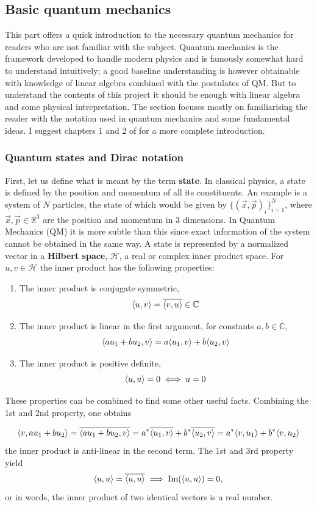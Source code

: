 
\subsection{Basic quantum mechanics}
This part offers a quick introduction to the necessary quantum mechanics for readers who are not familiar with the subject. Quantum mechanics is the framework developed to handle modern physics and is famously somewhat hard to understand intuitively; 
a good baseline understanding is however obtainable with knowledge of linear algebra combined with the postulates of QM. But to understand the contents of this project it should be enough with linear algebra and some physical intrepretation. The section focuses mostly on familiarising the reader with the notation used in quantum mechanics and some fundamental ideas. I suggest chapters 1  and 2 of \cite{Sakurai} for a more complete introduction.


\subsubsection{Quantum states and Dirac notation}
First, let us define what is meant by the term \textbf{state}. In classical physics, a state is defined by the position and momentum of all its constituents. An example is a system of $N$ particles, the state of which would be given by $\{ (\vec{x}, \vec{p})_i \}_{i=1}^N$, where $\vec{x},\vec{p} \in \mathbb{R}^3$ are the position and momentum in 3 dimensions. In Quantum Mechanics (QM) it is more subtle than this since exact information of the system cannot be obtained in the same way. A state is represented by a normalized vector in a \textbf{Hilbert space}, $\mathcal{H}$, a real or complex inner product space. For $u,v \in \mathcal{H}$ the inner product has the following properties:
\begin{enumerate}
\item  The inner product is conjugate symmetric, $$\langle u,v \rangle = \overline{\langle v,u \rangle} \in \mathbb{C}$$
\item The inner product is linear in the first argument, for constants $a,b\in \mathbb{C}$, $$\langle au_1 + bu_2,v \rangle = a\langle u_1,v \rangle + b\langle u_2,v \rangle$$
\item The inner product is positive definite, $$\langle u,u \rangle = 0 \iff u = 0$$
\end{enumerate}
These properties can be combined to find some other useful facts. Combining the 1st and 2nd property, one obtains

\begin{equation}
\langle v,au_1 + bu_2 \rangle = \overline{\langle au_1 + bu_2,v \rangle} = a^{*}\overline{\langle u_1,v \rangle} + b^{*}\overline{\langle u_2,v \rangle} =   a^{*}\langle v,u_1 \rangle + b^{*}\langle v,u_2 \rangle
\end{equation} 
the inner product is anti-linear in the second term. The 1st and 3rd property yield
\begin{equation}
\langle u,u \rangle = \overline{\langle u,u \rangle} \implies \text{Im}(\langle u,u \rangle) = 0,
\end{equation}
or in words, the inner product of two identical vectors is a real number.

